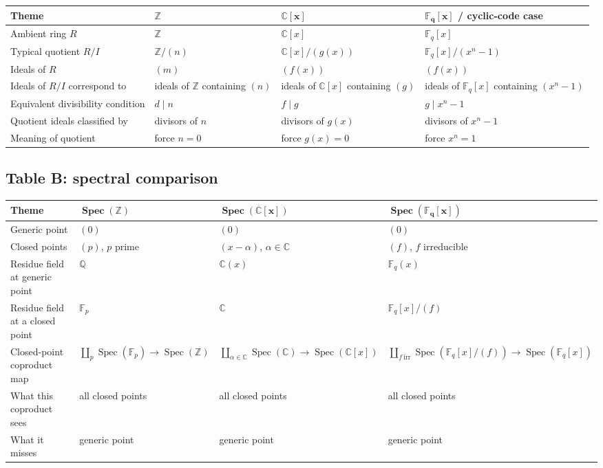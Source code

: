 \documentclass[11pt]{article}
\theoremstyle{definition}
\newcommand{\Z}{\mathbb{Z}}
\newcommand{\Q}{\mathbb{Q}}
\newcommand{\C}{\mathbb{C}}
\newcommand{\F}{\mathbb{F}}
\newcommand{\Spec}{\operatorname{Spec}}
\begin{document}
	\begin{longtable}{@{}p{}p{}p{}p{}@{}}
		\toprule
		\textbf{Theme} & \(\boldsymbol{\Z}\) & \(\boldsymbol{\C[x]}\) & \(\boldsymbol{\F_q[x]}\) / cyclic-code case \\ \midrule
		Ambient ring \(R\) & \(\Z\) & \(\C[x]\) & \(\F_q[x]\) \\
		Typical quotient \(R/I\) & \(\Z/(n)\) & \(\C[x]/(g(x))\) & \(\F_q[x]/(x^n-1)\) \\
		Ideals of \(R\) & \((m)\) & \((f(x))\) & \((f(x))\) \\
		Ideals of \(R/I\) correspond to & ideals of \(\Z\) containing \((n)\) & ideals of \(\C[x]\) containing \((g)\) & ideals of \(\F_q[x]\) containing \((x^n-1)\) \\
		Equivalent divisibility condition & \(d\mid n\) & \(f\mid g\) & \(g\mid x^n-1\) \\
		Quotient ideals classified by & divisors of \(n\) & divisors of \(g(x)\) & divisors of \(x^n-1\) \\
		Meaning of quotient & force \(n=0\) & force \(g(x)=0\) & force \(x^n=1\) \\
		\bottomrule
	\end{longtable}
	
	\subsection*{Table B: spectral comparison}
	
	\begin{longtable}{@{}p{}p{}p{}p{}@{}}
		\toprule
		\textbf{Theme} & \(\boldsymbol{\Spec(\Z)}\) & \(\boldsymbol{\Spec(\C[x])}\) & \(\boldsymbol{\Spec(\F_q[x])}\) \\ \midrule
		Generic point & \((0)\) & \((0)\) & \((0)\) \\
		Closed points & \((p)\), \(p\) prime & \((x-\alpha)\), \(\alpha\in\C\) & \((f)\), \(f\) irreducible \\
		Residue field at generic point & \(\Q\) & \(\C(x)\) & \(\F_q(x)\) \\
		Residue field at a closed point & \(\F_p\) & \(\C\) & \(\F_q[x]/(f)\) \\
		Closed-point coproduct map & \(\coprod_p \Spec(\F_p)\to \Spec(\Z)\) & \(\coprod_{\alpha\in\C}\Spec(\C)\to \Spec(\C[x])\) & \(\coprod_{f\ \mathrm{irr}}\Spec(\F_q[x]/(f))\to \Spec(\F_q[x])\) \\
		What this coproduct sees & all closed points & all closed points & all closed points \\
		What it misses & generic point & generic point & generic point \\
		\bottomrule
	\end{longtable}
	
\end{document}
